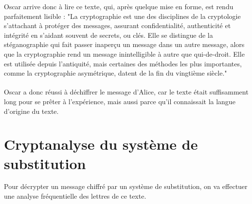 		Oscar arrive donc à lire ce texte, qui, après quelque mise en forme, est rendu parfaitement lisible :
		"La cryptographie est une des disciplines de la cryptologie s’attachant à protéger des messages, assurant confidentialité, authenticité et intégrité en s’aidant souvent de secrets, ou clés.
		Elle se distingue de la stéganographie qui fait passer inaperçu un message dans un autre message, alors que la cryptographie rend un message inintelligible à autre que qui-de-droit.
		Elle est utilisée depuis l’antiquité, mais certaines des méthodes les plus importantes, comme la cryptographie asymétrique, datent de la fin du vingtième siècle."\\
		\\
		Oscar a donc réussi à déchiffrer le message d'Alice, car le texte était suffisamment long pour se prêter à l'expérience, mais aussi parce qu'il connaissait la langue d'origine du texte.
	\section{Cryptanalyse du système de substitution}
		Pour décrypter un message chiffré par un système de substitution, on va effectuer une analyse fréquentielle des lettres de ce texte.
		